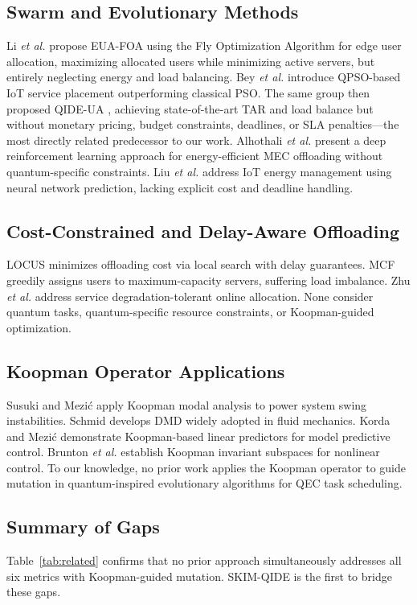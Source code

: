 \documentclass[10pt,twocolumn]{article}
\begin{document}
\subsection{Swarm and Evolutionary Methods}
Li \textit{et al.} \cite{ref13} propose EUA-FOA using the Fly Optimization Algorithm for edge user allocation, maximizing allocated users while minimizing active servers, but entirely neglecting energy and load balancing. Bey \textit{et al.} \cite{ref9} introduce QPSO-based IoT service placement outperforming classical PSO. The same group then proposed QIDE-UA \cite{ref14}, achieving state-of-the-art TAR and load balance but without monetary pricing, budget constraints, deadlines, or SLA penalties---the most directly related predecessor to our work. Alhothali \textit{et al.} \cite{ref23} present a deep reinforcement learning approach for energy-efficient MEC offloading without quantum-specific constraints. Liu \textit{et al.} \cite{ref24} address IoT energy management using neural network prediction, lacking explicit cost and deadline handling.

\subsection{Cost-Constrained and Delay-Aware Offloading}
LOCUS \cite{ref15} minimizes offloading cost via local search with delay guarantees. MCF \cite{ref16} greedily assigns users to maximum-capacity servers, suffering load imbalance. Zhu \textit{et al.} \cite{ref19} address service degradation-tolerant online allocation. None consider quantum tasks, quantum-specific resource constraints, or Koopman-guided optimization.

\subsection{Koopman Operator Applications}
Susuki and Mezi\'{c} \cite{ref17} apply Koopman modal analysis to power system swing instabilities. Schmid \cite{ref20} develops DMD widely adopted in fluid mechanics. Korda and Mezi\'{c} \cite{ref25} demonstrate Koopman-based linear predictors for model predictive control. Brunton \textit{et al.} \cite{ref26} establish Koopman invariant subspaces for nonlinear control. To our knowledge, no prior work applies the Koopman operator to guide mutation in quantum-inspired evolutionary algorithms for QEC task scheduling.

\subsection{Summary of Gaps}
Table~\ref{tab:related} confirms that no prior approach simultaneously addresses all six metrics with Koopman-guided mutation. SKIM-QIDE is the first to bridge these gaps.
\end{document}
